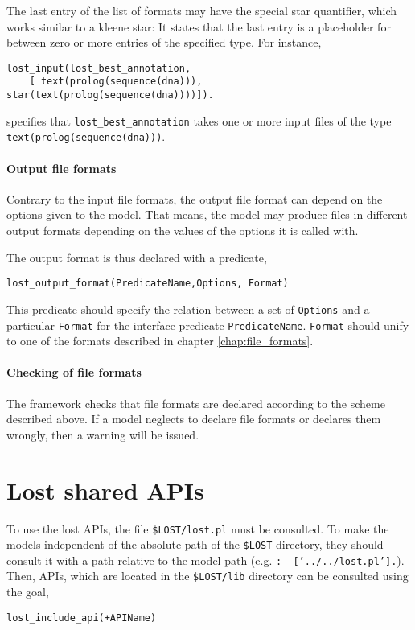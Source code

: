 \documentclass{book}
\begin{document}
The last entry of the list of formats may have the special star quantifier, which works 
similar to a kleene star: It states that the last entry is a placeholder for between zero or more entries of the specified type. For instance,
\begin{verbatim}
lost_input(lost_best_annotation, 
    [ text(prolog(sequence(dna))), star(text(prolog(sequence(dna))))]).
\end{verbatim}
\noindent
specifies that \texttt{lost\_best\_annotation} takes one or more input files of the type \texttt{text(prolog(sequence(dna)))}.

\subsubsection{Output file formats}

Contrary to the input file formats, the output file format can depend on the options given 
to the model. That means, the model may produce files in different output formats depending 
on the values of the options it is called with.

The output format is thus declared with a predicate, 
\begin{verbatim}
lost_output_format(PredicateName,Options, Format)
\end{verbatim}

\noindent
This predicate should specify the relation between a set of \texttt{Options} and a particular \texttt{Format} for the interface predicate \texttt{PredicateName}.
\texttt{Format} should unify to one of the formats described in
chapter \ref{chap:file_formats}.

\subsubsection{Checking of file formats}

The framework checks that file formats are declared according to the 
scheme described above. If a model neglects to declare file formats or
declares them wrongly, then a warning will be issued.

\chapter{Lost shared APIs}
\label{chap:lost_shared_apis}

To use the lost APIs, the file \texttt{\$LOST/lost.pl} must be consulted. To make the models
independent of the absolute path of the \texttt{\$LOST} directory, they should consult it with
a path relative to the model path (e.g. \texttt{:- ['../../lost.pl'].}).
 Then,
APIs, which are located in the \texttt{\$LOST/lib} directory
can be consulted using the goal, 
\begin{verbatim}
lost_include_api(+APIName)
\end{verbatim}
\end{document}
